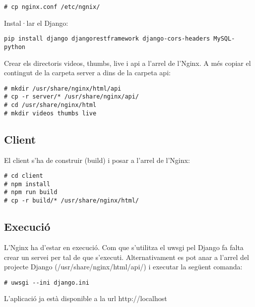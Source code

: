 \documentclass[12pt, titlepage]{article}
\begin{document}
\begin{lstlisting}
# cp nginx.conf /etc/ngnix/
\end{lstlisting}

Instal·lar el Django:

\begin{lstlisting}[breaklines]
pip install django djangorestframework django-cors-headers MySQL-python
\end{lstlisting}

Crear els directoris videos, thumbs, live i api a l'arrel de l'Nginx. A més copiar
el contingut de la carpeta server a dins de la carpeta api:

\begin{lstlisting}
# mkdir /usr/share/nginx/html/api
# cp -r server/* /usr/share/nginx/api/
# cd /usr/share/nginx/html
# mkdir videos thumbs live
\end{lstlisting}

\subsection{Client}

El client s'ha de construir (build) i posar a l'arrel de l'Nginx:

\begin{lstlisting}
# cd client
# npm install
# npm run build
# cp -r build/* /usr/share/nginx/html/
\end{lstlisting}

\subsection{Execució}

L'Nginx ha d'estar en execució. Com que s'utilitza el uwsgi pel Django fa falta
crear un servei per tal de que s'executi. Alternativament es pot anar a l'arrel
del projecte Django (/usr/share/nginx/html/api/) i executar la següent comanda:

\begin{lstlisting}
# uwsgi --ini django.ini
\end{lstlisting}

L'aplicació ja està disponible a la url http://localhost
\end{document}
